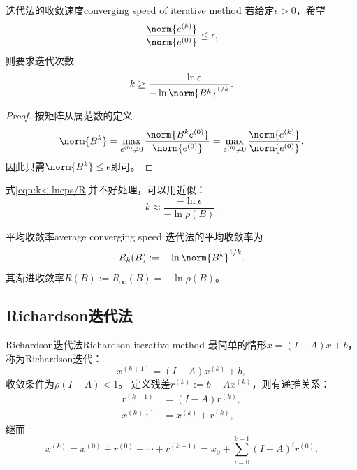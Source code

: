 \begin{theorem}
    {迭代法的收敛速度}{converging speed of iterative method}
    若给定$\epsilon>0$，希望
    \[
        \frac{\norm{e^{(k)}}}{\norm{e^{(0)}}}\leq\epsilon,
    \]
    则要求迭代次数
    \begin{equation}
        \label{eqn:k<-lneps/R}
        k\geq\frac{-\ln\epsilon}{-\ln\norm{B^k}^{1/k}}.
    \end{equation}
\end{theorem}

\begin{proof}
    按矩阵从属范数的定义
    \[
        \norm{B^k}=\max_{e^{(0)}\neq 0}\frac{\norm{B^ke^{(0)}}}{\norm{e^{(0)}}}=\max_{e^{(0)}\neq 0}\frac{\norm{e^{(k)}}}{\norm{e^{(0)}}}.
    \]
    因此只需$\norm{B^k}\leq\epsilon$即可。
\end{proof}

\begin{remark}
    式\eqref{eqn:k<-lneps/R}并不好处理，可以用近似：
    \[
        k\approx\frac{-\ln\epsilon}{-\ln\rho(B)}.
    \]
\end{remark}

\begin{definition}
    {平均收敛率}{average converging speed}
    迭代法的平均收敛率为
    \begin{equation}
        R_k(B):=-\ln\norm{B^k}^{1/k}.
    \end{equation}
    其渐进收敛率$R(B):=R_\infty(B)=-\ln\rho(B)$。
\end{definition}


\subsection{Richardson迭代法}

\begin{example}
    {Richardson迭代法}{Richardson iterative method}
    最简单的情形$x=(I-A)x+b$，称为Richardson迭代：
    \begin{equation}
        x^{(k+1)}=(I-A)x^{(k)}+b,
    \end{equation}
    收敛条件为$\rho(I-A)<1$。
    定义残差$r^{(k)}:=b-Ax^{(k)}$，则有递推关系：
    \begin{align*}
        r^{(k+1)}&=(I-A)r^{(k)},\\
        x^{(k+1)}&=x^{(k)}+r^{(k)},
    \end{align*}
    继而
    \[
        x^{(k)}=x^{(0)}+r^{(0)}+\cdots+r^{(k-1)}=x_0+\sum_{i=0}^{k-1}(I-A)^ir^{(0)}.
    \]
\end{example}

